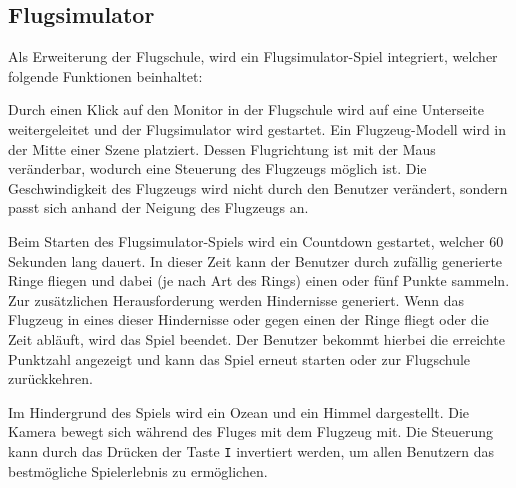 \subsection{Flugsimulator}

Als Erweiterung der Flugschule, wird ein Flugsimulator-Spiel integriert, welcher folgende Funktionen beinhaltet:

Durch einen Klick auf den Monitor in der Flugschule wird auf eine Unterseite weitergeleitet und der Flugsimulator wird gestartet.
Ein Flugzeug-Modell wird in der Mitte einer Szene platziert.
Dessen Flugrichtung ist mit der Maus veränderbar, wodurch eine Steuerung des Flugzeugs möglich ist.
Die Geschwindigkeit des Flugzeugs wird nicht durch den Benutzer verändert, sondern passt sich anhand der Neigung des Flugzeugs an.

Beim Starten des Flugsimulator-Spiels wird ein Countdown gestartet, welcher 60 Sekunden lang dauert.
In dieser Zeit kann der Benutzer durch zufällig generierte Ringe fliegen und dabei (je nach Art des Rings) einen oder fünf Punkte sammeln.
Zur zusätzlichen Herausforderung werden Hindernisse generiert.
Wenn das Flugzeug in eines dieser Hindernisse oder gegen einen der Ringe fliegt oder die Zeit abläuft, wird das Spiel beendet.
Der Benutzer bekommt hierbei die erreichte Punktzahl angezeigt und kann das Spiel erneut starten oder zur Flugschule zurückkehren.

Im Hindergrund des Spiels wird ein Ozean und ein Himmel dargestellt.
Die Kamera bewegt sich während des Fluges mit dem Flugzeug mit.
Die Steuerung kann durch das Drücken der Taste \texttt{I} invertiert werden, um allen Benutzern das bestmögliche Spielerlebnis zu ermöglichen.